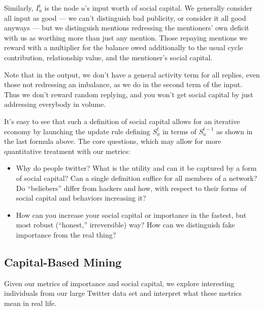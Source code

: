 \documentclass[10pt,oneside]{memoir}
\begin{document}
Similarly, $I_{u}^{t}$ is the node $u$'s input worth of social capital. We generally consider all input as good — we can't distinguish bad publicity, or consider it all good anyways — but we distinguish mentions redressing the mentioners' own deficit with us as worthing more than just any mention. Those repaying mentions we reward with a multiplier for the balance owed additionally to the usual cycle contribution, relationship value, and the mentioner's social capital.

Note that in the output, we don't have a general activity term for all replies, even those not redressing an imbalance, as we do in the second term of the input. Thus we don't reward random replying, and you won't get social capital by just addressing everybody in volume.

It's easy to see that such a definition of social capital allows for an iterative economy by launching the update rule defining $S_{u}^{t}$ in terms of $S_{u}^{t-1}$ as shown in the last formula above.
The core questions, which may allow for more quantitative treatment with our metrics:


\begin{itemize}


\item Why do people twitter? What is the utility and can it be captured by a form of social capital? Can a single definition suffice for all members of a network? Do ``beliebers'' differ from hackers and how, with respect to their forms of social capital and behaviors increasing it?




\item How can you increase your social capital or importance in the fastest, but most robust (``honest,'' irreversible) way? How can we distinguish fake importance from the real thing?



\end{itemize}

\pagebreak \subsection{Capital-Based Mining}
\label{capital-basedmining}

Given our metrics of importance and social capital, we explore interesting individuals from our large Twitter data set and interpret what these metrics mean in real life. 
\end{document}
